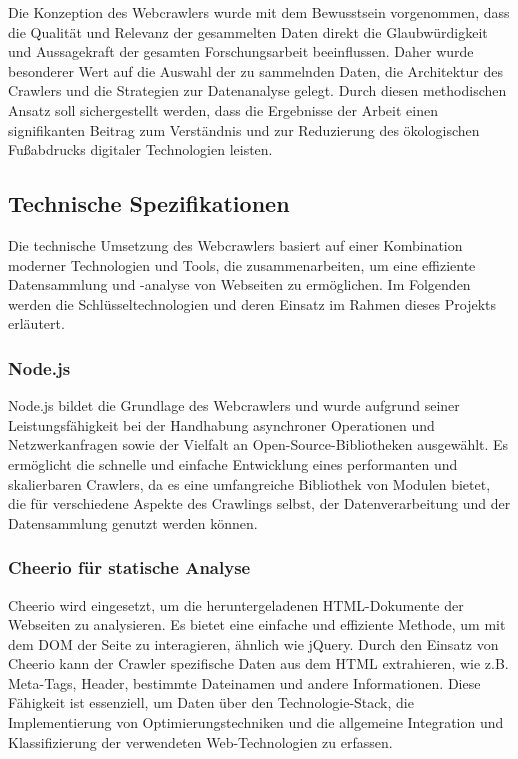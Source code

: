 \documentclass[Bachelor,BIF,german,IEEE]{BASE/twbook}
\begin{document}
\noindent Die Konzeption des Webcrawlers wurde mit dem Bewusstsein vorgenommen, dass die Qualität und Relevanz der gesammelten Daten direkt die Glaubwürdigkeit und Aussagekraft der gesamten Forschungsarbeit beeinflussen. Daher wurde besonderer Wert auf die Auswahl der zu sammelnden Daten, die Architektur des Crawlers und die Strategien zur Datenanalyse gelegt. Durch diesen methodischen Ansatz soll sichergestellt werden, dass die Ergebnisse der Arbeit einen signifikanten Beitrag zum Verständnis und zur Reduzierung des ökologischen Fußabdrucks digitaler Technologien leisten.

\subsection{Technische Spezifikationen}
\noindent Die technische Umsetzung des Webcrawlers basiert auf einer Kombination moderner Technologien und Tools, die zusammenarbeiten, um eine effiziente Datensammlung und -analyse von Webseiten zu ermöglichen. Im Folgenden werden die Schlüsseltechnologien und deren Einsatz im Rahmen dieses Projekts erläutert.

\subsubsection{Node.js}
Node.js \cite{NPM24} bildet die Grundlage des Webcrawlers und wurde aufgrund seiner Leistungsfähigkeit bei der Handhabung asynchroner Operationen und Netzwerkanfragen sowie der Vielfalt an Open-Source-Bibliotheken ausgewählt. Es ermöglicht die schnelle und einfache Entwicklung eines performanten und skalierbaren Crawlers, da es eine umfangreiche Bibliothek von Modulen bietet, die für verschiedene Aspekte des Crawlings selbst, der Datenverarbeitung und der Datensammlung genutzt werden können.

\subsubsection{Cheerio für statische Analyse}
Cheerio \cite{CHEER24} wird eingesetzt, um die heruntergeladenen HTML-Dokumente der Webseiten zu analysieren. Es bietet eine einfache und effiziente Methode, um mit dem DOM der Seite zu interagieren, ähnlich wie jQuery. Durch den Einsatz von Cheerio kann der Crawler spezifische Daten aus dem HTML extrahieren, wie z.B. Meta-Tags, Header, bestimmte Dateinamen und andere Informationen. Diese Fähigkeit ist essenziell, um Daten über den Technologie-Stack, die Implementierung von Optimierungstechniken und die allgemeine Integration und Klassifizierung der verwendeten Web-Technologien zu erfassen.
\end{document}
